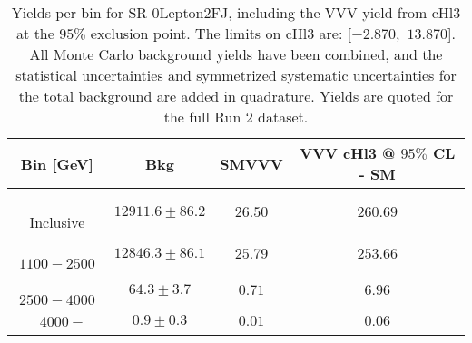 \begin{table}[!htbp]
    \small
    \center
    \begin{tabular}{c||c|c|c}
    Bin [GeV] & Bkg & SMVVV & \pbox{20cm}{VVV \\ cHl3 @ $95\%$ CL - SM \\ }\\
    \hline
    \pbox{20cm}{ ~ \\Inclusive\\ } & $12911.6 \pm 86.2$ & $26.50$ & $260.69$\\
    \hline
    \pbox{20cm}{ ~ \\$1100-2500$\\ } & $12846.3 \pm 86.1$ & $25.79$ & $253.66$\\
    \hline
    \pbox{20cm}{ ~ \\$2500-4000$\\ } & $64.3 \pm 3.7$ & $0.71$ & $6.96$\\
    \hline
    \pbox{20cm}{ ~ \\$4000-$\\ } & $0.9 \pm 0.3$ & $0.01$ & $0.06$\\
\end{tabular}
    \caption{Yields per bin for SR 0Lepton2FJ, including the VVV yield from cHl3 at the $95$\% exclusion point. The limits on cHl3 are: [$-2.870$,~$13.870$]. All Monte Carlo background yields have been combined, and the statistical uncertainties and symmetrized systematic uncertainties for the total background are added in quadrature. Yields are quoted for the full Run 2 dataset.}
    \label{tab:0Lepton2FJ$binssignal}
\end{table}
